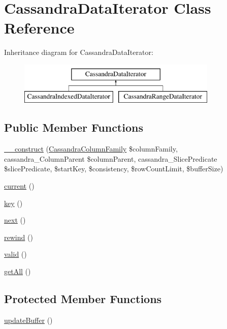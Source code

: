 \hypertarget{classCassandraDataIterator}{
\section{CassandraDataIterator Class Reference}
\label{classCassandraDataIterator}
}
Inheritance diagram for CassandraDataIterator:\begin{figure}[H]
\begin{center}
\leavevmode
\includegraphics[height=2.000000cm]{classCassandraDataIterator}
\end{center}
\end{figure}
\subsection*{Public Member Functions}
\begin{DoxyCompactItemize}
\item 
\hyperlink{classCassandraDataIterator_adfcc357f08ade6908e0304a8c93226b4}{\_\-\_\-construct} (\hyperlink{classCassandraColumnFamily}{CassandraColumnFamily} \$columnFamily, cassandra\_\-ColumnParent \$columnParent, cassandra\_\-SlicePredicate \$slicePredicate, \$startKey, \$consistency, \$rowCountLimit, \$bufferSize)
\item 
\hyperlink{classCassandraDataIterator_a4543482c99d8a586477214766783978b}{current} ()
\item 
\hyperlink{classCassandraDataIterator_a4cbe7dbf861e1deffaf14ae5cf2e4696}{key} ()
\item 
\hyperlink{classCassandraDataIterator_a33a1d60da9dd9e9d610f2720558914d3}{next} ()
\item 
\hyperlink{classCassandraDataIterator_a768a5fdcefd168820cf2ce498d4b2215}{rewind} ()
\item 
\hyperlink{classCassandraDataIterator_a5378a5276e6095d7e199ddb493d24ad8}{valid} ()
\item 
\hyperlink{classCassandraDataIterator_abc2745605d011776a747505aafff43b3}{getAll} ()
\end{DoxyCompactItemize}
\subsection*{Protected Member Functions}
\begin{DoxyCompactItemize}
\item 
\hyperlink{classCassandraDataIterator_a20435cd4a3a06df86d62f9975933c808}{updateBuffer} ()
\end{DoxyCompactItemize}
